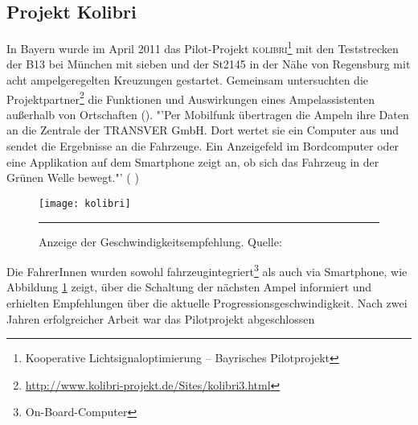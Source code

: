 \subsection*{\label{sec:kolibri}Projekt Kolibri}
In Bayern wurde im April 2011 das Pilot-Projekt \textsc{kolibri}\footnote{ Kooperative Lichtsignaloptimierung -- Bayrisches Pilotprojekt} mit den Teststrecken der B13 bei München mit sieben und der St2145 in der Nähe von Regensburg mit acht ampelgeregelten Kreuzungen gestartet. Gemeinsam untersuchten die Projektpartner\footnote{ \url{http://www.kolibri-projekt.de/Sites/kolibri3.html}} die Funktionen und Auswirkungen eines Ampelassistenten außerhalb von Ortschaften (\cite{kolibri}). "'Per Mobilfunk übertragen die Ampeln ihre Daten an die Zentrale der TRANSVER GmbH. Dort wertet sie ein Computer aus und sendet die Ergebnisse an die Fahrzeuge. Ein Anzeigefeld im Bordcomputer oder eine Applikation auf dem \gls{Smartphone} zeigt an, ob sich das Fahrzeug in der Grünen Welle bewegt."' (\cite{kolibriTUM} ) 
\begin{figure}[H]  
    \centering  
    \texttt{[image: kolibri]}   
    \rule{35em}{0.5pt}   
    \caption[Projekt Kolibri]{Anzeige der Geschwindigkeitsempfehlung. Quelle: \cite{kolibri}}
    \label{fig:kolibri}
\end{figure}
Die FahrerInnen wurden sowohl fahrzeugintegriert\footnote{ On-Board-Computer} als auch via \gls{Smartphone}, wie Abbildung \ref{fig:kolibri} zeigt, über die Schaltung der nächsten Ampel informiert und erhielten Empfehlungen über die aktuelle Progressionsgeschwindigkeit. Nach zwei Jahren erfolgreicher Arbeit war das Pilotprojekt abgeschlossen 
